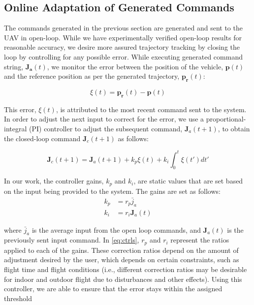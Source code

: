 \documentclass[letterpaper, 10 pt, conference]{ieeeconf}  %
\begin{document}
\subsection{Online Adaptation of Generated Commands} \label{sec:adapt}

The commands generated in the previous section are generated and sent to the UAV in open-loop. While we have experimentally verified open-loop results for reasonable accuracy, we desire more assured trajectory tracking by closing the loop by controlling for any possible error. While executing generated command string, $\bm{J_a}(t)$, we monitor the error between the position of the vehicle, $\bm{p}(t)$ and the reference position as per the generated trajectory, $\bm{p_r}(t)$:

\begin{equation}
    \xi(t) = \bm{p_r}(t)-\bm{p}(t)
\end{equation}

This error, $\xi(t)$, is attributed to the most recent command sent to the system. In order to adjust the next input to correct for the error, we use a proportional-integral (PI) controller to adjust the subsequent command, $\bm{J}_a(t+1)$, to obtain the closed-loop command $\bm{J}_c(t+1)$ as follows:

\begin{equation}
    \bm{J}_c(t+1) = \bm{J}_a(t+1) + k_p\xi(t) + k_i\int_{0}^{t}\xi(t')dt'
\end{equation}

In our work, the controller gains, $k_p$ and $k_i$, are static values that are set based on the input being provided to the system. The gains are set as follows:
\begin{align} \label{eq:ctrls}
    k_p &= r_p\bar{j}_a  \nonumber \\
    k_i &= r_i\bm{J}_a(t)
\end{align}

where $\bar{j}_a$ is the average input from the open loop commands, and $\bm{J}_a(t)$ is the previously sent input command. In \eqref{eq:ctrls}, $r_p$ and $r_i$ represent the ratios applied to each of the gains. These correction ratios depend on the amount of adjustment desired by the user, which depends on certain constraints, such as flight time and flight conditions (i.e., different correction ratios may be desirable for indoor and outdoor flight due to disturbances and other effects). Using this controller, we are able to ensure that the error stays within the assigned threshold
\end{document}

